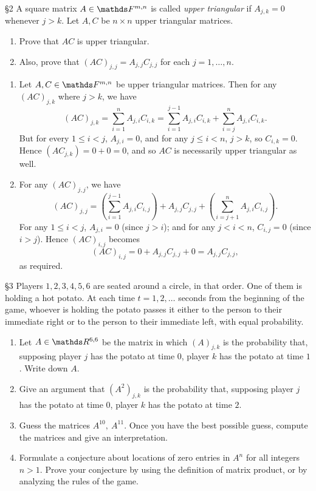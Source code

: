 \documentclass{homework}
\begin{document}
\begin{problem}{\S 2}
  A square matrix $A\in \F^{m,n}$ is called \textit{upper triangular} if $A_{j,k}=0$ whenever $j>k$.
  Let $A,C$ be $n\times n$ upper triangular matrices.
  \begin{enumerate}[label=(\alph*)]
    \item Prove that $AC$ is upper triangular.
    \item Also, prove that $(AC)_{j,j}=A_{j,j}C_{j,j}$ for each $j=1,\ldots,n$.
  \end{enumerate}
\end{problem}


\begin{solution}
  \begin{enumerate}[label=(\alph*)]
    \item Let $A,C\in \F^{m,n}$ be upper triangular matrices. Then for any $(AC)_{j,k}$ where $j>k$, we
      have \[
        (AC)_{j,k}=\sum_{i=1}^{n} A_{j,i}C_{i,k}=\sum_{i=1}^{j-1} A_{j,i}C_{i,k}+\sum_{i=j}^{n}
        A_{j,i}C_{i,k}
      .\] But for every $1\le i<j$, $A_{j,i}=0$, and for any $j\le i<n$, $j>k$, so $C_{i,k}=0$.
      Hence $(AC_{j,k})=0+0=0$, and so $AC$ is necessarily upper triangular as well.

    \item For any $(AC)_{j,j}$, we have \[
        (AC)_{j,j}=\left(\sum_{i=1}^{j-1} A_{j,i}C_{i,j}\right)+A_{j,j}C_{j,j}+\left( \sum_{i=j+1}^{n}
        A_{j,i}C_{i,j} \right) 
      .\] For any $1\le i<j$, $A_{j,i}=0$ (since $j>i$); and for any $j<i<n$, $C_{i,j}=0$ (since
      $i>j$). Hence $(AC)_{i,j}$ becomes \[
        (AC)_{i,j}=0 +A_{j,j}C_{j,j}+0=A_{j,j}C_{j,j}
      ,\] as required.
  \end{enumerate}
\end{solution}


\begin{problem}{\S 3}
  Players $1,2,3,4,5,6$ are seated around a circle, in that order. One of them is holding a hot
  potato. At each time $t=1,2,\ldots$ seconds from the beginning of the game, whoever is holding the
  potato passes it either to the person to their immediate right or to the person to their immediate
  left, with equal probability.
  \begin{enumerate}[label=(\alph*)]
    \item Let $A\in \R^{6,6}$ be the matrix in which $(A)_{j,k}$ is the probability that, supposing
      player $j$ has the potato at time $0$, player $k$ has the potato at time $1$. Write down $A$.
    \item Give an argument that $(A^2)_{j,k}$ is the probability that, supposing player $j$ has the
      potato at time $0$, player $k$ has the potato at time $2$.
    \item Guess the matrices $A^{10},\ A^{11}$. Once you have the best possible guess, compute the
      matrices and give an interpretation.
    \item Formulate a conjecture about locations of zero entries in $A^{n}$ for all integers $n>1$.
      Prove your conjecture by using the definition of matrix product, or by analyzing the rules of
      the game.
  \end{enumerate}
\end{problem}
\end{document}
